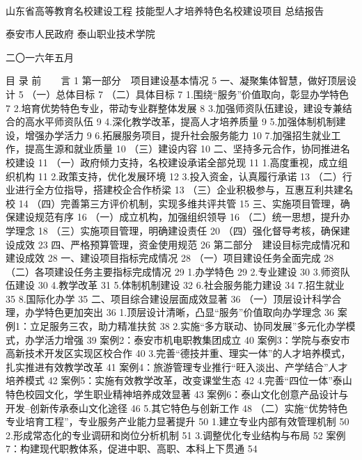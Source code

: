 　　　　　　　　　　　　　　　　　　　　　　　　　　　




山东省高等教育名校建设工程
技能型人才培养特色名校建设项目
总结报告









泰安市人民政府
泰山职业技术学院

二〇一六年五月

目   录
前　　言	1
第一部分　项目建设基本情况	5
一、凝聚集体智慧，做好顶层设计	5
（一）总体目标	7
（二）具体目标	7
1.围绕“服务”价值取向，彰显办学特色	7
2.培育优势特色专业，带动专业群整体发展	8
3.加强师资队伍建设，建设专兼结合的高水平师资队伍	9
4.深化教学改革，提高人才培养质量	9
5.加强体制机制建设，增强办学活力	9
6.拓展服务项目，提升社会服务能力	10
7.加强招生就业工作，提高生源和就业质量	10
（三）建设内容	10
二、坚持多元合作，协同推进名校建设	11
（一）政府倾力支持，名校建设承诺全部兑现	11
1.高度重视，成立组织机构	11
2.政策支持，优化发展环境	12
3.投入资金，认真履行承诺	13
（二）行业进行全方位指导，搭建校企合作桥梁	13
（三）企业积极参与，互惠互利共建名校	14
（四）完善第三方评价机制，实现多维共评共管	15
三、实施项目管理，确保建设规范有序	16
（一）成立机构，加强组织领导	16
（二）统一思想，提升办学理念	18
（三）实施项目管理，明确建设责任	20
（四）强化督导考核，确保建设成效	23
四、严格预算管理，资金使用规范	26
第二部分　建设目标完成情况和建设成效	28
一、建设项目指标完成情况	28
（一）项目建设任务全面完成	28
（二）各项建设任务主要指标完成情况	29
1.办学特色	29
2.专业建设	30
3.师资队伍建设	30
4.教学改革	31
5.体制机制建设	32
6.社会服务能力建设	34
7.招生就业	35
8.国际化办学	35
二、项目综合建设层面成效显著	36
（一）顶层设计科学合理，办学特色更加突出	36
1.顶层设计清晰，凸显“服务”价值取向办学理念	36
案例1：立足服务三农，助力精准扶贫	38
2.实施“多方联动、协同发展”多元化办学模式，办学活力增强	39
案例2：泰安市机电职教集团成立	40
案例3：学院与泰安市高新技术开发区实现区校合作	40
3.完善“德技并重、理实一体”的人才培养模式，扎实推进有效教学改革	41
案例4：旅游管理专业推行“旺入淡出、产学结合”人才培养模式	42
案例5：实施有效教学改革，改变课堂生态	42
4.完善“四位一体”泰山特色校园文化，学生职业精神培养成效显著	43
案例6：泰山文化创意产品设计与开发--创新传承泰山文化途径	46
5.其它特色与创新工作	48
（二）实施“优势特色专业培育工程”，专业服务产业能力显著提升	50
1.建立专业内部有效管理机制	50
2.形成常态化的专业调研和岗位分析机制	51
3.调整优化专业结构与布局	52
案例7：构建现代职教体系，促进中职、高职、本科上下贯通	54
